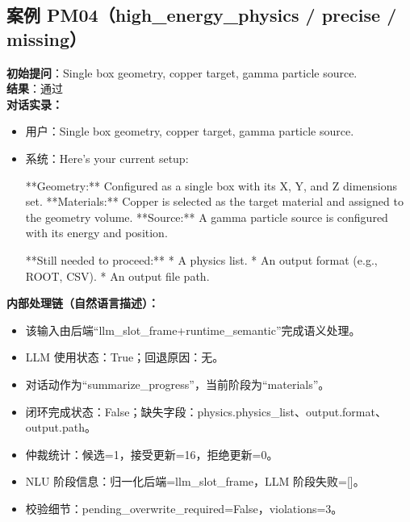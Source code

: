 \documentclass[11pt]{ctexart}
\begin{document}
\subsection{案例 PM04（high\_energy\_physics / precise / missing）}
\textbf{初始提问}：Single box geometry, copper target, gamma particle source.\\
\textbf{结果}：通过\\
\textbf{对话实录：}
\begin{itemize}
\item 用户：Single box geometry, copper target, gamma particle source.
\item 系统：Here's your current setup:

**Geometry:** Configured as a single box with its X, Y, and Z dimensions set.
**Materials:** Copper is selected as the target material and assigned to the geometry volume.
**Source:** A gamma particle source is configured with its energy and position.

**Still needed to proceed:**
*   A physics list.
*   An output format (e.g., ROOT, CSV).
*   An output file path.
\end{itemize}
\textbf{内部处理链（自然语言描述）：}
\begin{itemize}
\item 该输入由后端“llm\_slot\_frame+runtime\_semantic”完成语义处理。
\item LLM 使用状态：True；回退原因：无。
\item 对话动作为“summarize\_progress”，当前阶段为“materials”。
\item 闭环完成状态：False；缺失字段：physics.physics\_list、output.format、output.path。
\item 仲裁统计：候选=1，接受更新=16，拒绝更新=0。
\item NLU 阶段信息：归一化后端=llm\_slot\_frame，LLM 阶段失败=[]。
\item 校验细节：pending\_overwrite\_required=False，violations=3。
\end{itemize}
\end{document}

